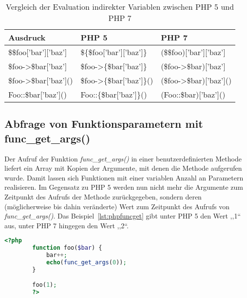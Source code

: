     \begin{table}[]
        \caption{Vergleich der Evaluation indirekter Variablen zwischen PHP 5 und PHP 7}
        \label{tab:indirect-expressions}
        \begin{tabular}{lll}
        \textbf{Ausdruck}               & \textbf{PHP 5}                    & \textbf{PHP 7}                \\ \hline
        \$\$foo{[}'bar'{]}{[}'baz'{]}   & \$\{\$foo{[}'bar'{]}{[}'baz'{]}\} & (\$\$foo){[}'bar'{]}{[}'baz'{]} \\ \hline
        \$foo->\$bar{[}'baz'{]}         & \$foo->\{\$bar{[}'baz'{]}\}       & (\$foo->\$bar){[}'baz'{]}       \\ \hline
        \$foo->\$bar{[}'baz'{]}()       & \$foo->\{\$bar{[}'baz'{]}\}()     & (\$foo->\$bar){[}'baz'{]}()     \\ \hline
        Foo::\$bar{[}'baz'{]}()         & Foo::\{\$bar{[}'baz'{]}\}()       & (Foo::\$bar){[}'baz'{]}()    
        \end{tabular}
    \end{table}

    \subsection{Abfrage von Funktionsparametern mit func\_get\_args()}
    Der Aufruf der Funktion \textit{func\_get\_args()} in einer benutzerdefinierten Methode liefert ein Array mit Kopien der 
    Argumente, mit denen die Methode aufgerufen wurde. Damit lassen sich Funktionen mit einer variablen Anzahl an Parametern 
    realisieren. Im Gegensatz zu \ac{PHP} 5 werden nun nicht mehr die Argumente zum Zeitpunkt des Aufrufs der Methode 
    zurückgegeben, sondern deren (möglicherweise bis dahin veränderte) Wert zum Zeitpunkt des Aufrufs von 
    \textit{func\_get\_args()}. Das Beispiel~\ref{lst:phpfuncget} gibt unter \ac{PHP} 5 den Wert ,,1`` aus, unter \ac{PHP} 7 
    hingegen den Wert ,,2``.

    \begin{lstlisting}[language=php, caption={Beispiel des Aufrufs von func\_get\_args()}, label={lst:phpfuncget}]
        <?php
        function foo($bar) {
            bar++;
            echo(func_get_args(0));
        }

        foo(1);
        ?>
    \end{lstlisting}


